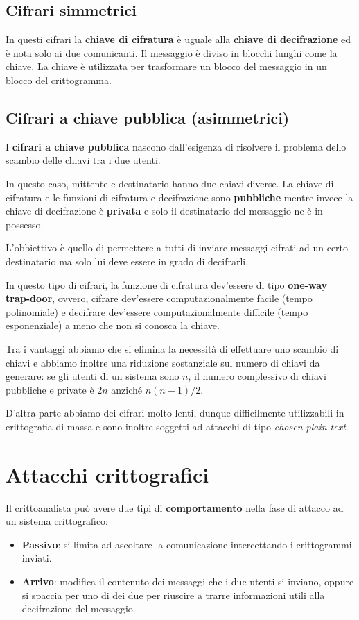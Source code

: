\subsection{Cifrari simmetrici}
In questi cifrari la \textbf{chiave di cifratura} \`e uguale alla \textbf{chiave di decifrazione} ed \`e nota solo ai
due comunicanti. Il messaggio \`e diviso in blocchi lunghi come la chiave. La chiave \`e utilizzata per trasformare un
blocco del messaggio in un blocco del crittogramma.

\subsection{Cifrari a chiave pubblica (asimmetrici)}
I \textbf{cifrari a chiave pubblica} nascono dall'esigenza di risolvere il problema dello scambio delle chiavi tra i due
utenti.

In questo caso, mittente e destinatario hanno due chiavi diverse. La chiave di cifratura e le funzioni di cifratura e
decifrazione sono \textbf{pubbliche} mentre invece la chiave di decifrazione \`e \textbf{privata} e solo il destinatario
del messaggio ne \`e in possesso.

L'obbiettivo \`e quello di permettere a tutti di inviare messaggi cifrati ad un certo destinatario ma solo lui deve
essere in grado di decifrarli.

In questo tipo di cifrari, la funzione di cifratura dev'essere di tipo \textbf{one-way trap-door}, ovvero, cifrare
dev'essere computazionalmente facile (tempo polinomiale) e decifrare dev'essere computazionalmente difficile (tempo
esponenziale) a meno che non si conosca la chiave.

Tra i vantaggi abbiamo che si elimina la necessit\`a di effettuare uno scambio di chiavi e abbiamo inoltre una riduzione
sostanziale sul numero di chiavi da generare: se gli utenti di un sistema sono $n$, il numero complessivo di chiavi
pubbliche e private \`e $2n$ anzich\'e $n (n-1) / 2$.

D'altra parte abbiamo dei cifrari molto lenti, dunque difficilmente utilizzabili in crittografia di massa e sono inoltre
soggetti ad attacchi di tipo \emph{chosen plain text}.

\section{Attacchi crittografici}\label{attacchi}
Il crittoanalista pu\`o avere due tipi di \textbf{comportamento} nella fase di attacco ad un sistema crittografico:
\begin{itemize}
	\item \textbf{Passivo}: si limita ad ascoltare la comunicazione intercettando i crittogrammi inviati.
	\item \textbf{Arrivo}: modifica il contenuto dei messaggi che i due utenti si inviano, oppure si spaccia per uno di
	      dei due per riuscire a trarre informazioni utili alla decifrazione del messaggio.
\end{itemize}

